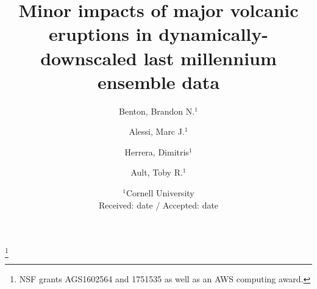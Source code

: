 \documentclass[smallextended]{svjour3}       %
\begin{document}
\title{Minor impacts of major volcanic eruptions in
  dynamically-downscaled last millennium ensemble data} %

\thanks{NSF grants AGS1602564 and 1751535 as well as an AWS computing award.} %

%




\author{Benton, Brandon N.$^1$ \and Alessi, Marc J.$^1$ \and Herrera, Dimitris$^1$ \and Ault, Toby R.$^1$}



\date{$^1$Cornell University \\
Received: date / Accepted: date}

\maketitle
\end{document}
